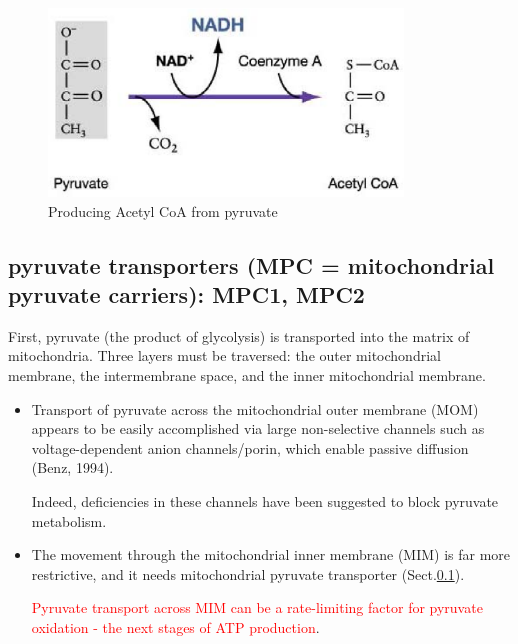 \begin{figure}[hbt]
  \centerline{\includegraphics[height=5cm,
    angle=0]{./images/pyruvate2AcetyleCoA.eps}}
\caption{Producing Acetyl CoA from pyruvate}
\label{fig:pyruvate2AcetylCoA}
\end{figure}

\subsection{pyruvate transporters (MPC = mitochondrial pyruvate carriers): MPC1,
MPC2}
\label{sec:pyruvate-transporter}
\label{sec:pyruvate-translocase}

First, pyruvate (the product of glycolysis) is transported into the matrix of
mitochondria. Three layers must be traversed: the outer mitochondrial membrane,
the intermembrane space, and the inner mitochondrial membrane.
\begin{itemize}
  \item  Transport of pyruvate across the mitochondrial outer membrane
  (MOM) appears to be easily accomplished via large non-selective channels such
  as voltage-dependent anion channels/porin, which enable passive diffusion (Benz,
  1994).

Indeed, deficiencies in these channels have been suggested to block pyruvate
metabolism.

%
%
%

  \item  The movement through the mitochondrial inner membrane (MIM) is far more
  restrictive,  and it needs mitochondrial pyruvate transporter
  (Sect.\ref{sec:pyruvate-transporter}).

\textcolor{red}{Pyruvate transport across MIM can be a rate-limiting factor for
pyruvate oxidation - the next stages of ATP production}.
\end{itemize}

